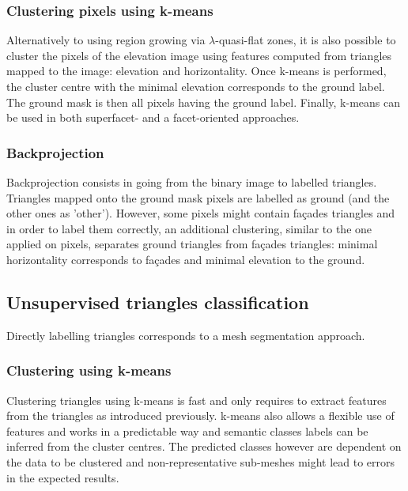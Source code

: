 \documentclass{kththesis}
\begin{document}
\subsubsection{Clustering pixels using k-means}
Alternatively to using region growing via $\lambda$-quasi-flat zones, it is also possible to cluster the pixels of the elevation image using features computed from triangles mapped to the image: elevation and horizontality. Once k-means is performed, the cluster centre with the minimal elevation corresponds to the ground label. The ground mask is then all pixels having the ground label. Finally, k-means can be used in both superfacet- and a facet-oriented approaches.

\subsubsection{Backprojection}
Backprojection consists in going from the binary image to labelled triangles. Triangles mapped onto the ground mask pixels are labelled as ground (and the other ones as 'other'). However, some pixels might contain façades triangles and in order to label them correctly, an additional clustering, similar to the one applied on pixels, separates ground triangles from façades triangles: minimal horizontality corresponds to façades and minimal elevation to the ground.  \\


\subsection{Unsupervised triangles classification}
Directly labelling triangles corresponds to a mesh segmentation approach. 
\subsubsection{Clustering using k-means}
Clustering triangles using k-means is fast and only requires to extract features from the triangles as introduced previously. k-means also allows a flexible use of features and works in a predictable way and semantic classes labels can be inferred from the cluster centres. The predicted classes however are dependent on the data to be clustered and non-representative sub-meshes might lead to errors in the expected results. 
\end{document}
